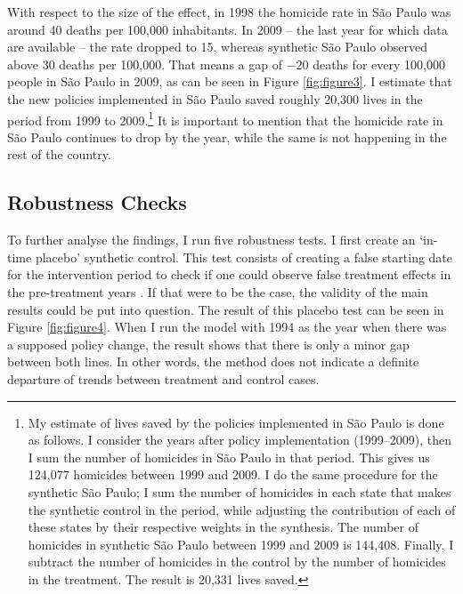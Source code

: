With respect to the size of the effect, in 1998 the homicide rate in São Paulo was around 40 deaths per 100,000 inhabitants. In 2009 -- the last year for which data are available -- the rate dropped to 15, whereas synthetic São Paulo observed above 30 deaths per 100,000. That means a gap of $-20$ deaths for every 100,000 people in São Paulo in 2009, as can be seen in Figure \ref{fig:figure3}. I estimate that the new policies implemented in São Paulo saved roughly 20,300 lives in the period from 1999 to 2009.\footnote{My estimate of lives saved by the policies implemented in São Paulo is done as follows. I consider the years after policy implementation (1999--2009), then I sum the number of homicides in São Paulo in that period. This gives us 124,077 homicides between 1999 and 2009. I do the same procedure for the synthetic São Paulo; I sum the number of homicides in each state that makes the synthetic control in the period, while adjusting the contribution of each of these states by their respective weights in the synthesis. The number of homicides in synthetic São Paulo between 1999 and 2009 is 144,408. Finally, I subtract the number of homicides in the control by the number of homicides in the treatment. The result is 20,331 lives saved.} It is important to mention that the homicide rate in São Paulo continues to drop by the year, while the same is not happening in the rest of the country. 

\subsection{Robustness Checks}

To further analyse the findings, I run five robustness tests. I first create an `in-time placebo' synthetic control. This test consists of creating a false starting date for the intervention period to check if one could observe false treatment effects in the pre-treatment years \citep{abadie2014}. If that were to be the case, the validity of the main results could be put into question. The result of this placebo test can be seen in Figure \ref{fig:figure4}. When I run the model with 1994 as the year when there was a supposed policy change, the result shows that there is only a minor gap between both lines. In other words, the method does not indicate a definite departure of trends between treatment and control cases. 

